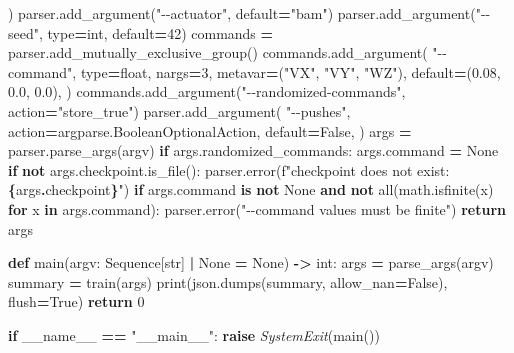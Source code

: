 \documentclass[
  american,
  11pt,
  letterpaper,
]{article}
\newenvironment{Shaded}{\begin{snugshade}}{\end{snugshade}}
\newcommand{\BuiltInTok}[1]{#1}
\newcommand{\ControlFlowTok}[1]{\textcolor[rgb]{0.13,0.29,0.53}{\textbf{#1}}}
\newcommand{\DecValTok}[1]{\textcolor[rgb]{0.00,0.00,0.81}{#1}}
\newcommand{\FloatTok}[1]{\textcolor[rgb]{0.00,0.00,0.81}{#1}}
\newcommand{\KeywordTok}[1]{\textcolor[rgb]{0.13,0.29,0.53}{\textbf{#1}}}
\newcommand{\NormalTok}[1]{#1}
\newcommand{\OperatorTok}[1]{\textcolor[rgb]{0.81,0.36,0.00}{\textbf{#1}}}
\newcommand{\PreprocessorTok}[1]{\textcolor[rgb]{0.56,0.35,0.01}{\textit{#1}}}
\newcommand{\SpecialCharTok}[1]{\textcolor[rgb]{0.81,0.36,0.00}{\textbf{#1}}}
\newcommand{\SpecialStringTok}[1]{\textcolor[rgb]{0.31,0.60,0.02}{#1}}
\newcommand{\StringTok}[1]{\textcolor[rgb]{0.31,0.60,0.02}{#1}}
\newcommand{\VariableTok}[1]{\textcolor[rgb]{0.00,0.00,0.00}{#1}}
\renewenvironment{Shaded}{\par\smallskip}{\par\smallskip}
\begin{document}
\begin{Shaded}
\begin{Highlighting}[]
\NormalTok{    )}
\NormalTok{    parser.add\_argument(}\StringTok{"{-}{-}actuator"}\NormalTok{, default}\OperatorTok{=}\StringTok{"bam"}\NormalTok{)}
\NormalTok{    parser.add\_argument(}\StringTok{"{-}{-}seed"}\NormalTok{, }\BuiltInTok{type}\OperatorTok{=}\BuiltInTok{int}\NormalTok{, default}\OperatorTok{=}\DecValTok{42}\NormalTok{)}
\NormalTok{    commands }\OperatorTok{=}\NormalTok{ parser.add\_mutually\_exclusive\_group()}
\NormalTok{    commands.add\_argument(}
        \StringTok{"{-}{-}command"}\NormalTok{,}
        \BuiltInTok{type}\OperatorTok{=}\BuiltInTok{float}\NormalTok{,}
\NormalTok{        nargs}\OperatorTok{=}\DecValTok{3}\NormalTok{,}
\NormalTok{        metavar}\OperatorTok{=}\NormalTok{(}\StringTok{"VX"}\NormalTok{, }\StringTok{"VY"}\NormalTok{, }\StringTok{"WZ"}\NormalTok{),}
\NormalTok{        default}\OperatorTok{=}\NormalTok{(}\FloatTok{0.08}\NormalTok{, }\FloatTok{0.0}\NormalTok{, }\FloatTok{0.0}\NormalTok{),}
\NormalTok{    )}
\NormalTok{    commands.add\_argument(}\StringTok{"{-}{-}randomized{-}commands"}\NormalTok{, action}\OperatorTok{=}\StringTok{"store\_true"}\NormalTok{)}
\NormalTok{    parser.add\_argument(}
        \StringTok{"{-}{-}pushes"}\NormalTok{,}
\NormalTok{        action}\OperatorTok{=}\NormalTok{argparse.BooleanOptionalAction,}
\NormalTok{        default}\OperatorTok{=}\VariableTok{False}\NormalTok{,}
\NormalTok{    )}
\NormalTok{    args }\OperatorTok{=}\NormalTok{ parser.parse\_args(argv)}
    \ControlFlowTok{if}\NormalTok{ args.randomized\_commands:}
\NormalTok{        args.command }\OperatorTok{=} \VariableTok{None}
    \ControlFlowTok{if} \KeywordTok{not}\NormalTok{ args.checkpoint.is\_file():}
\NormalTok{        parser.error(}\SpecialStringTok{f"checkpoint does not exist: }\SpecialCharTok{\{}\NormalTok{args}\SpecialCharTok{.}\NormalTok{checkpoint}\SpecialCharTok{\}}\SpecialStringTok{"}\NormalTok{)}
    \ControlFlowTok{if}\NormalTok{ args.command }\KeywordTok{is} \KeywordTok{not} \VariableTok{None} \KeywordTok{and} \KeywordTok{not} \BuiltInTok{all}\NormalTok{(math.isfinite(x) }\ControlFlowTok{for}\NormalTok{ x }\KeywordTok{in}\NormalTok{ args.command):}
\NormalTok{        parser.error(}\StringTok{"{-}{-}command values must be finite"}\NormalTok{)}
    \ControlFlowTok{return}\NormalTok{ args}


\KeywordTok{def}\NormalTok{ main(argv: Sequence[}\BuiltInTok{str}\NormalTok{] }\OperatorTok{|} \VariableTok{None} \OperatorTok{=} \VariableTok{None}\NormalTok{) }\OperatorTok{{-}\textgreater{}} \BuiltInTok{int}\NormalTok{:}
\NormalTok{    args }\OperatorTok{=}\NormalTok{ parse\_args(argv)}
\NormalTok{    summary }\OperatorTok{=}\NormalTok{ train(args)}
    \BuiltInTok{print}\NormalTok{(json.dumps(summary, allow\_nan}\OperatorTok{=}\VariableTok{False}\NormalTok{), flush}\OperatorTok{=}\VariableTok{True}\NormalTok{)}
    \ControlFlowTok{return} \DecValTok{0}


\ControlFlowTok{if} \VariableTok{\_\_name\_\_} \OperatorTok{==} \StringTok{"\_\_main\_\_"}\NormalTok{:}
    \ControlFlowTok{raise} \PreprocessorTok{SystemExit}\NormalTok{(main())}
\end{Highlighting}
\end{Shaded}
\end{document}
